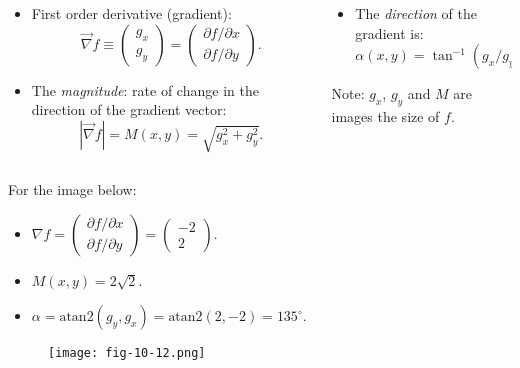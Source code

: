 \begin{frame}
\begin{columns}
\begin{column}{.5\textwidth}
\begin{itemize}
\item First order derivative (gradient):
\[
\vec{\nabla} f \equiv %
\left (
\begin{array}{c}
g_{x} \\
g_{y}
\end{array}
\right )
=
\left (
\begin{array}{c}
\partial f / \partial x \\
\partial f / \partial y
\end{array}
\right ).
\]
\item The \textit{magnitude}: rate of change in the direction of the gradient vector:
\[
| \vec{\nabla} f | = M(x,y) = \sqrt{g_{x}^{2} + g_{y}^{2}}.
\]
\end{itemize}
\end{column}
\begin{column}{.5\textwidth}
\begin{itemize}
\item The \textit{direction} of the gradient is:
\[
\alpha(x,y) = \tan^{-1}(g_{x} / g_{y}).
\]
\end{itemize}
Note: $g_{x}$, $g_{y}$ and $M$ are images the size of $f$.
\end{column}
\end{columns}
\end{frame}

\begin{frame}
For the image below:
\begin{itemize}
\item $\nabla f = \left (
\begin{array}{c}
\partial	f / \partial x \\
\partial f / \partial y
\end{array}
\right )
=
\left (
\begin{array}{c}
-2 \\
2
\end{array}
\right )
$.
\item $M(x,y) = 2\sqrt{2}$.
\item $\alpha = \text{atan2} (g_{y} , g_{x}) = \text{atan2}  ( 2, -2 ) = 135^{\circ}$.
\end{itemize}
\begin{figure}[!h]
\texttt{[image: fig-10-12.png]}
\end{figure}
\end{frame}

